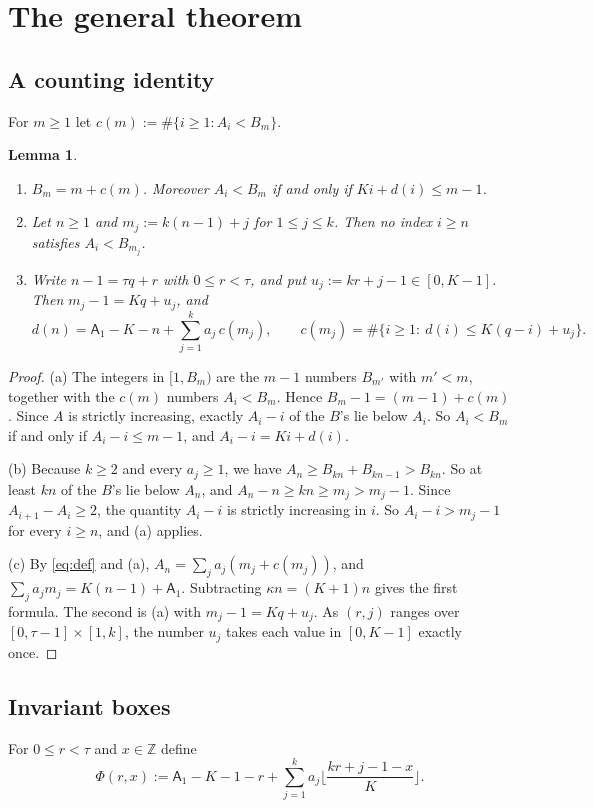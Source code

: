 \documentclass[11pt]{amsart}
\newtheorem{lemma}[theorem]{Lemma}
\theoremstyle{definition}
\theoremstyle{remark}
\newcommand{\Z}{\mathbb{Z}}
\begin{document}
\section{The general theorem}\label{sec:general}

\subsection{A counting identity}
For $m\ge1$ let $c(m):=\#\{i\ge1: A_i<B_m\}$.

\begin{lemma}\label{lem:count}
\leavevmode
\begin{enumerate}
\item[(a)] $B_m=m+c(m)$. Moreover $A_i<B_m$ if and only if $Ki+d(i)\le m-1$.
\item[(b)] Let $n\ge1$ and $m_j:=k(n-1)+j$ for $1\le j\le k$. Then no index $i\ge n$ satisfies $A_i<B_{m_j}$.
\item[(c)] Write $n-1=\tau q+r$ with $0\le r<\tau$, and put $u_j:=kr+j-1\in[0,K-1]$. Then $m_j-1=Kq+u_j$, and
\begin{equation}\label{eq:star}
d(n)=\mathsf A_1-K-n+\sum_{j=1}^k a_j\,c(m_j),\qquad c(m_j)=\#\{i\ge1:\ d(i)\le K(q-i)+u_j\}.
\end{equation}
\end{enumerate}
\end{lemma}

\begin{proof}
(a) The integers in $[1,B_m)$ are the $m-1$ numbers $B_{m'}$ with $m'<m$, together with the $c(m)$ numbers $A_i<B_m$. Hence $B_m-1=(m-1)+c(m)$. Since $A$ is strictly increasing, exactly $A_i-i$ of the $B$'s lie below $A_i$. So $A_i<B_m$ if and only if $A_i-i\le m-1$, and $A_i-i=Ki+d(i)$.

(b) Because $k\ge2$ and every $a_j\ge1$, we have $A_n\ge B_{kn}+B_{kn-1}>B_{kn}$. So at least $kn$ of the $B$'s lie below $A_n$, and $A_n-n\ge kn\ge m_j>m_j-1$. Since $A_{i+1}-A_i\ge2$, the quantity $A_i-i$ is strictly increasing in $i$. So $A_i-i>m_j-1$ for every $i\ge n$, and (a) applies.

(c) By \eqref{eq:def} and (a), $A_n=\sum_ja_j(m_j+c(m_j))$, and $\sum_ja_jm_j=K(n-1)+\mathsf A_1$. Subtracting $\kappa n=(K+1)n$ gives the first formula. The second is (a) with $m_j-1=Kq+u_j$. As $(r,j)$ ranges over $[0,\tau-1]\times[1,k]$, the number $u_j$ takes each value in $[0,K-1]$ exactly once.
\end{proof}

\subsection{Invariant boxes}
For $0\le r<\tau$ and $x\in\Z$ define
\[
\Phi(r,x):=\mathsf A_1-K-1-r+\sum_{j=1}^ka_j\Big\lfloor\frac{kr+j-1-x}{K}\Big\rfloor .
\]
\end{document}
